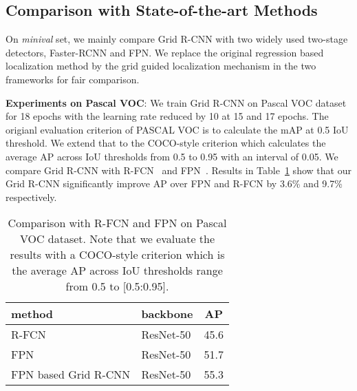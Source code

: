 \documentclass[10pt,twocolumn,letterpaper]{article}
\begin{document}
\subsection{Comparison with State-of-the-art Methods}
On \textit{minival} set, we mainly compare Grid R-CNN with two widely used two-stage detectors, Faster-RCNN and FPN. We replace the original regression based localization method by the grid guided localization mechanism in the two frameworks for fair comparison. 


\textbf{Experiments on Pascal VOC}: We train Grid R-CNN on Pascal VOC dataset for 18 epochs with the learning rate reduced by 10 at 15 and 17 epochs. The origianl evaluation criterion of PASCAL VOC is to calculate the mAP at 0.5 IoU threshold. We extend that to the COCO-style criterion which calculates the average AP across IoU thresholds from 0.5 to 0.95 with an interval of 0.05. We compare Grid R-CNN with R-FCN~\cite{dai2016r} and FPN~\cite{lin2017feature}. Results in Table~\ref{tab:voc} show that our Grid R-CNN significantly improve AP over FPN and R-FCN by 3.6\% and 9.7\% respectively.
\begin{table}[t]
\begin{center}
\begin{tabular}{ l | l | c  }
\hline
method & backbone & AP \\
\hline
R-FCN & ResNet-50  & 45.6  \\
FPN & ResNet-50  & 51.7  \\
FPN based Grid R-CNN & ResNet-50  & 55.3 \\
\hline
\end{tabular}
\vspace{1mm}
\caption{Comparison with R-FCN and FPN on Pascal VOC dataset. Note that we evaluate the results with a COCO-style criterion which is the average AP across IoU thresholds range from 0.5 to [0.5:0.95].}
\label{tab:voc}
\vspace{-5mm}
\end{center}
\end{table}
\end{document}
